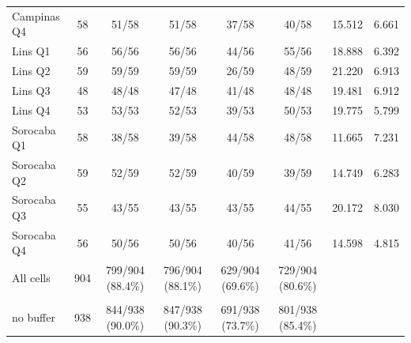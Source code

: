 \begin{tabular}{lccccccc}
Campinas Q4 & 58 & 51/58 & 51/58 & 37/58 & 40/58 & 15.512 & 6.661 \\
Lins Q1 & 56 & 56/56 & 56/56 & 44/56 & 55/56 & 18.888 & 6.392 \\
Lins Q2 & 59 & 59/59 & 59/59 & 26/59 & 48/59 & 21.220 & 6.913 \\
Lins Q3 & 48 & 48/48 & 47/48 & 41/48 & 48/48 & 19.481 & 6.912 \\
Lins Q4 & 53 & 53/53 & 52/53 & 39/53 & 50/53 & 19.775 & 5.799 \\
Sorocaba Q1 & 58 & 38/58 & 39/58 & 44/58 & 48/58 & 11.665 & 7.231 \\
Sorocaba Q2 & 59 & 52/59 & 52/59 & 40/59 & 39/59 & 14.749 & 6.283 \\
Sorocaba Q3 & 55 & 43/55 & 43/55 & 43/55 & 44/55 & 20.172 & 8.030 \\
Sorocaba Q4 & 56 & 50/56 & 50/56 & 40/56 & 41/56 & 14.598 & 4.815 \\
\midrule
All cells & 904 & 799/904 (88.4\%) & 796/904 (88.1\%) & 629/904 (69.6\%) & 729/904 (80.6\%) & & \\
\celula{All cells, \\ \relax no buffer} & 938 & 844/938 (90.0\%) & 847/938 (90.3\%) & 691/938 (73.7\%) & 801/938 (85.4\%) & & \\
\bottomrule
\end{tabular}
